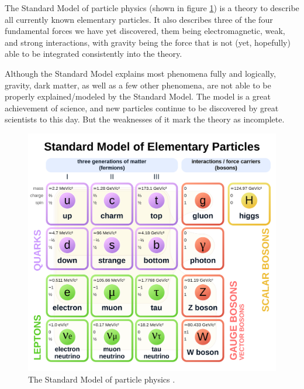 \documentclass[a4paper,10pt]{scrartcl}
\begin{document}

The Standard Model of particle physics (shown in figure \ref{fig:standardmodel}) is a theory to describe all currently known elementary particles.
It also describes three of the four fundamental forces we have yet discovered, them being electromagnetic, weak, and strong interactions, with gravity being the force that is not (yet, hopefully) able to be integrated consistently into the theory.

Although the Standard Model explains most phenomena fully and logically, gravity, dark matter, as well as a few other phenomena, are not able to be properly explained/modeled by the Standard Model.
The model is a great achievement of science, and new particles continue to be discovered by great scientists to this day.
But the weaknesses of it mark the theory as incomplete.

\begin{figure}[h]
    \includegraphics[scale=0.12]{images/Standard_Model_of_Elementary_Particles.svg.png}
    \centering
    \caption{The Standard Model of particle physics \cite{wiki:Standard_Model}.}
    \label{fig:standardmodel}
\end{figure}
\end{document}
